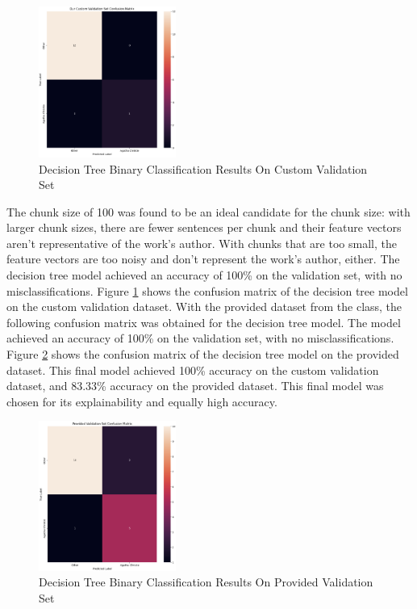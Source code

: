 \documentclass[journal]{IEEEtran} %
\begin{document}
\begin{figure}[h!]
    \caption{Decision Tree Binary Classification Results On Custom Validation Set}
    \begin{center}
    \centerline{\includegraphics[width=0.4\textwidth]{./dt1.png}}
    \end{center}
    \centering
    \label{dt}
\end{figure}

The chunk size of 100 was found to be an ideal candidate for the chunk size: with larger chunk sizes, there are fewer sentences per chunk and their feature vectors aren't representative of the work's author. With chunks that are too small, the feature vectors are too noisy and don't represent the work's author, either. The decision tree model achieved an accuracy of 100\% on the validation set, with no misclassifications. Figure \ref{dt} shows the confusion matrix of the decision tree model on the custom validation dataset.
With the provided dataset from the class, the following confusion matrix was obtained for the decision tree model. The model achieved an accuracy of 100\% on the validation set, with no misclassifications. Figure \ref{dt2} shows the confusion matrix of the decision tree model on the provided dataset. This final model achieved 100\% accuracy on the custom validation dataset, and 83.33\% accuracy on the provided dataset.
This final model was chosen for its explainability and equally high accuracy.

\begin{figure}
    \caption{Decision Tree Binary Classification Results On Provided Validation Set}
    \begin{center}
    \centerline{\includegraphics[width=0.4\textwidth]{./dt2.png}}
    \end{center}
    \centering
    \label{dt2}
\end{figure}
\end{document}
